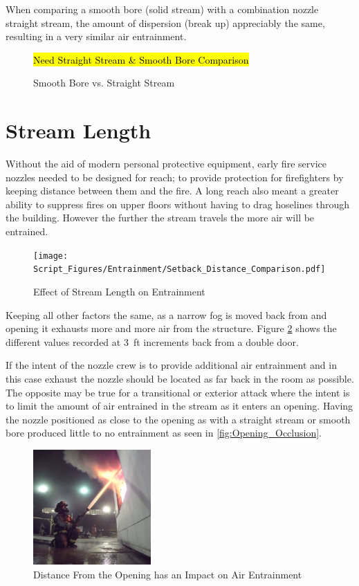\documentclass[12pt,oneside]{book}
\begin{document}
When comparing a smooth bore (solid stream) with a combination nozzle straight stream, the amount of dispersion (break up) appreciably the same, resulting in a very similar air entrainment. 

\begin{figure}[!ht]
\centering
\hl{Need Straight Stream \& Smooth Bore Comparison}
\caption{Smooth Bore vs. Straight Stream}
\label{fig:SB_vs_StraightStream}
\end{figure}

\section{Stream Length}
Without the aid of modern personal protective equipment, early fire service nozzles needed to be designed for reach; to provide protection for firefighters by keeping distance between them and the fire. A long reach also meant a greater ability to suppress fires on upper floors without having to drag hoselines through the building. However the further the stream travels the more air will be entrained. 

\begin{figure}[!ht]
\centering
\texttt{[image: Script\_Figures/Entrainment/Setback\_Distance\_Comparison.pdf]}
\caption{Effect of Stream Length on Entrainment}
\label{fig:Setback}
\end{figure}

Keeping all other factors the same, as a narrow fog is moved back from and opening it exhausts more and more air from the structure. Figure \ref{fig:Setback} shows the different values recorded at 3~ft increments back from a double door. 


If the intent of the nozzle crew is to provide additional air entrainment and in this case exhaust the nozzle should be located as far back in the room as possible. The opposite may be true for a transitional or exterior attack where the intent is to limit the amount of air entrained in the stream as it enters an opening. Having the nozzle positioned as close to the opening as with a straight stream or smooth bore produced little to no entrainment as seen in \ref{fig:Opening_Occlusion}.

\begin{figure}[!ht]
\centering
\includegraphics[width=0.4\textwidth]{Figures/Air_Entrainment/Exterior_Attack.png}
\caption{Distance From the Opening has an Impact on Air Entrainment}
\label{fig:ExteriorDist}
\end{figure}
\end{document}
